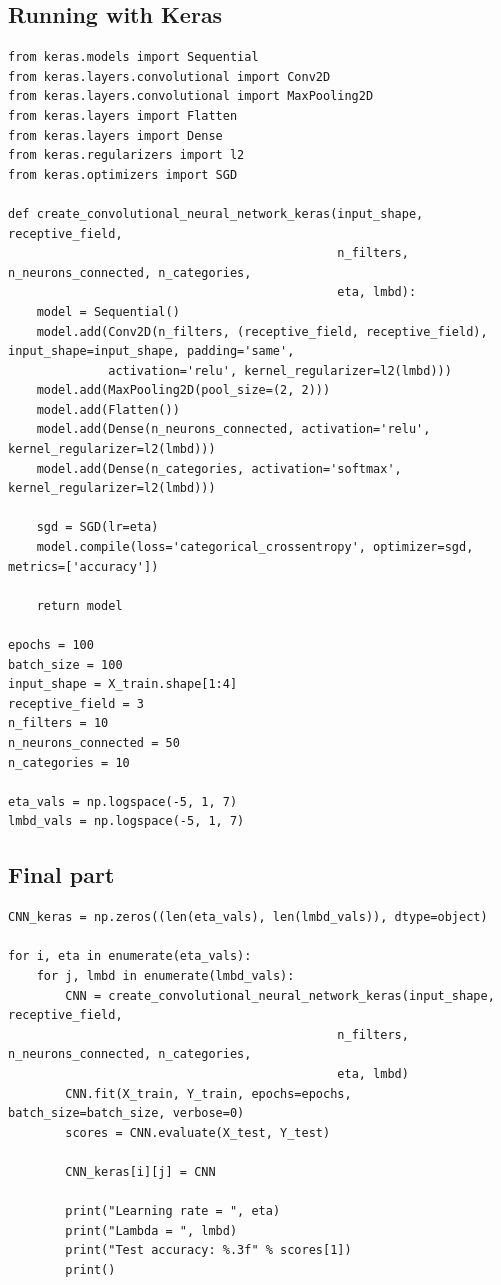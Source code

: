 \documentclass[%
oneside,                 %
final,                   %
10pt]{article}
\begin{document}
\subsection*{Running with Keras}

\begin{verbatim}
from keras.models import Sequential
from keras.layers.convolutional import Conv2D
from keras.layers.convolutional import MaxPooling2D
from keras.layers import Flatten
from keras.layers import Dense
from keras.regularizers import l2
from keras.optimizers import SGD

def create_convolutional_neural_network_keras(input_shape, receptive_field,
                                              n_filters, n_neurons_connected, n_categories,
                                              eta, lmbd):
    model = Sequential()
    model.add(Conv2D(n_filters, (receptive_field, receptive_field), input_shape=input_shape, padding='same',
              activation='relu', kernel_regularizer=l2(lmbd)))
    model.add(MaxPooling2D(pool_size=(2, 2)))
    model.add(Flatten())
    model.add(Dense(n_neurons_connected, activation='relu', kernel_regularizer=l2(lmbd)))
    model.add(Dense(n_categories, activation='softmax', kernel_regularizer=l2(lmbd)))
    
    sgd = SGD(lr=eta)
    model.compile(loss='categorical_crossentropy', optimizer=sgd, metrics=['accuracy'])
    
    return model

epochs = 100
batch_size = 100
input_shape = X_train.shape[1:4]
receptive_field = 3
n_filters = 10
n_neurons_connected = 50
n_categories = 10

eta_vals = np.logspace(-5, 1, 7)
lmbd_vals = np.logspace(-5, 1, 7)
\end{verbatim}

\subsection*{Final part}

\begin{verbatim}
CNN_keras = np.zeros((len(eta_vals), len(lmbd_vals)), dtype=object)
        
for i, eta in enumerate(eta_vals):
    for j, lmbd in enumerate(lmbd_vals):
        CNN = create_convolutional_neural_network_keras(input_shape, receptive_field,
                                              n_filters, n_neurons_connected, n_categories,
                                              eta, lmbd)
        CNN.fit(X_train, Y_train, epochs=epochs, batch_size=batch_size, verbose=0)
        scores = CNN.evaluate(X_test, Y_test)
        
        CNN_keras[i][j] = CNN
        
        print("Learning rate = ", eta)
        print("Lambda = ", lmbd)
        print("Test accuracy: %.3f" % scores[1])
        print()
\end{verbatim}
\end{document}
